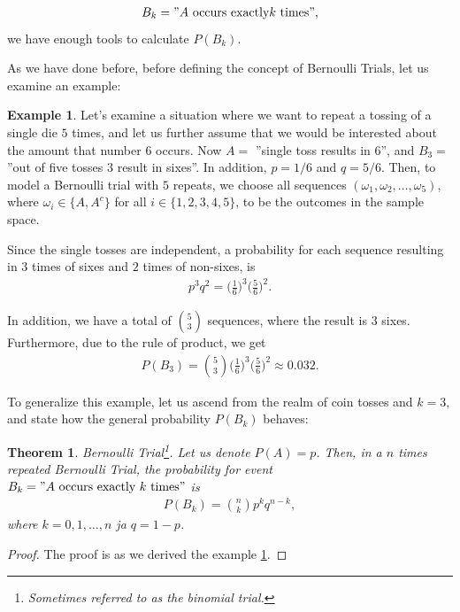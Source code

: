 \documentclass[12pt,a4paper,leqno]{report}
\theoremstyle{plain}
\newtheorem{lause}[equation]{Theorem}
\theoremstyle{definition}
\newtheorem{esim}[equation]{Example}
\begin{document}
\begin{align*}
B_k = "A \text{ occurs exactly} k \text{ times}",
\end{align*}
we have enough tools to calculate $P(B_k)$.
 	
As we have done before, before defining the concept of Bernoulli Trials, let us examine an example:

\begin{esim}\label{toistoesim}
Let's examine a situation where we want to repeat a tossing of a single die $5$ times, and let us further assume that we would be interested about the amount that number $6$ occurs. Now $A=$ ''single toss results in 6'', and $B_3=$ ''out of five tosses $3$ result in sixes''. In addition,  $p=1/6$ and $q=5/6$. Then, to model a Bernoulli trial with $5$ repeats, we choose all sequences $(\omega_1,\omega_2,\dots,\omega_5)$, where $\omega_i \in \{A,A^c\}$ for all $i\in \{1,2,3,4,5\}$, to be the outcomes in the sample space.

Since the single tosses are independent, a probability for each sequence resulting in $3$ times of sixes and $2$ times of non-sixes, is
\begin{align*}
p^3 q^{2} = \Big(\frac{1}{6}\Big)^3 \Big(\frac{5}{6}\Big)^2.
\end{align*}

In addition, we have a total of $\binom{5}{3}$ sequences, where the result is $3$ sixes. Furthermore, due to the rule of product, we get
\begin{align*}
P(B_3)= \binom{5}{3}\Big(\frac{1}{6}\Big)^3 \Big(\frac{5}{6}\Big)^2 \approx 0.032.
\end{align*}
\end{esim}

To generalize this example, let us ascend from the realm of coin tosses and $k=3$, and state how the general probability $P(B_k)$ behaves:

\begin{lause}\label{lause:toistokoe}
Bernoulli Trial\footnote{Sometimes referred to as the binomial trial.}.  Let us denote $P(A)=p$. Then, in a  $n$ times repeated \emph{Bernoulli Trial}, the probability for event $B_k= "A \text{ occurs exactly } k \text{ times}"$ is 
\begin{align*}
P(B_k)= \binom{n}{k}p^k q^{n-k},
\end{align*}
where $k=0,1,\dots,n$ ja $q=1-p$.
\end{lause}

\begin{proof}
The proof is as we derived the example \ref{toistoesim}.
\end{proof}
\end{document}
